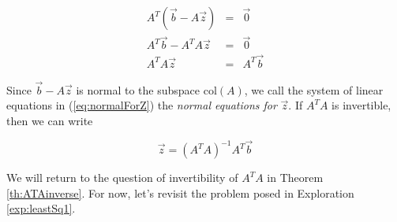 \documentclass{ximera}
\begin{document}
\begin{eqnarray}
A^T(\vec{b}-A\vec{z})&=&\vec{0}\nonumber\\
A^T\vec{b}-A^TA\vec{z}&=&\vec{0}\nonumber\\
A^TA\vec{z}&=&A^T\vec{b}\label{eq:normalForZ}
\end{eqnarray}

Since $\vec{b}-A\vec{z}$ is normal to the subspace $\text{col}(A)$, we call the system of linear equations in (\ref{eq:normalForZ}) the \emph{normal equations for} $\vec{z}$.  If $A^TA$ is invertible, then we can write

\begin{equation}\label{eq:leastSquaresZ}
    \vec{z}=(A^TA)^{-1}A^T\vec{b}
\end{equation}

We will return to the question of invertibility of $A^TA$ in Theorem \ref{th:ATAinverse}.  For now, let's revisit the problem posed in Exploration \ref{exp:leastSq1}.
\end{document}
